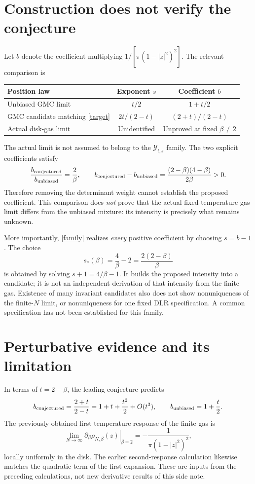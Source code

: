 \documentclass[11pt]{article}
\begin{document}
\section{Construction does not verify the conjecture}
Let $b$ denote the coefficient multiplying
$1/[\pi(1-|z|^2)^2]$. The relevant comparison is
\begin{center}
\begin{tabularx}{\linewidth}{@{}Xcc@{}}
\toprule
Position law & Exponent $s$ & Coefficient $b$\\
\midrule
Unbiased GMC limit & $t/2$ & $1+t/2$\\[3pt]
GMC candidate matching \eqref{target} & $2t/(2-t)$ & $(2+t)/(2-t)$\\[3pt]
Actual disk-gas limit & Unidentified & Unproved at fixed $\beta\ne2$\\
\bottomrule
\end{tabularx}
\end{center}
The actual limit is not assumed to belong to the $\mathcal Y_{t,s}$ family.
The two explicit coefficients satisfy
\[
 \frac{b_{\rm conjectured}}{b_{\rm unbiased}}=\frac2\beta,
 \qquad
 b_{\rm conjectured}-b_{\rm unbiased}
 =\frac{(2-\beta)(4-\beta)}{2\beta}>0.
\]
Therefore removing the determinant weight cannot establish the proposed
coefficient. This comparison does \emph{not} prove that the actual
fixed-temperature gas limit differs from the unbiased mixture: its
intensity is precisely what remains unknown.

More importantly, \eqref{family} realizes \emph{every} positive
coefficient by choosing $s=b-1$. The choice
\begin{equation}\label{sstar}
 s_*(\beta)=\frac4\beta-2=\frac{2(2-\beta)}\beta
\end{equation}
is obtained by solving $s+1=4/\beta-1$. It builds the proposed intensity
into a candidate; it is not an independent derivation of that intensity
from the finite gas. Existence of many invariant candidates also does not
show nonuniqueness of the finite-$N$ limit, or nonuniqueness for one fixed
DLR specification. A common specification has not been established for
this family.

\section{Perturbative evidence and its limitation}
In terms of $t=2-\beta$, the leading conjecture predicts
\[
 b_{\rm conjectured}=\frac{2+t}{2-t}
 =1+t+\frac{t^2}{2}+O(t^3),
 \qquad
 b_{\rm unbiased}=1+\frac t2.
\]
The previously obtained first temperature response of the finite gas is
\[
 \lim_{N\to\infty}
 \left.\partial_\beta\rho_{N,\beta}(z)\right|_{\beta=2}
 =-\frac1{\pi(1-|z|^2)^2},
\]
locally uniformly in the disk. The earlier second-response calculation
likewise matches the quadratic term of the first expansion. These are
inputs from the preceding calculations, not new derivative results of
this side note.
\end{document}
